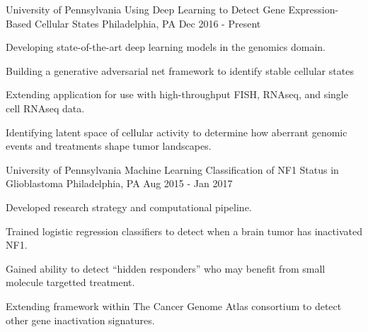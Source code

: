 

\begin{cventries}

  \cventry
    {University of Pennsylvania} %
    {Using Deep Learning to Detect Gene Expression-Based Cellular States}
    {Philadelphia, PA} %
    {Dec 2016 - Present} %
    {
      \begin{cvitems} %
        \item {Developing state-of-the-art deep learning models in the genomics
               domain.}
        \item {Building a generative adversarial net framework to identify
               stable cellular states}
        \item {Extending application for use with high-throughput FISH, RNAseq,
               and single cell RNAseq data.}
        \item {Identifying latent space of cellular activity to determine how
               aberrant genomic events and treatments shape tumor landscapes.}
      \end{cvitems}
    }

  \cventry
    {University of Pennsylvania} %
    {Machine Learning Classification of NF1 Status in Glioblastoma}
    {Philadelphia, PA} %
    {Aug 2015 - Jan 2017} %
    {
      \begin{cvitems} %
        \item {Developed research strategy and computational pipeline.}
        \item {Trained logistic regression classifiers to detect when a brain
               tumor has inactivated NF1.}
        \item {Gained ability to detect ``hidden responders'' who may benefit
               from small molecule targetted treatment.}
        \item {Extending framework within The Cancer Genome Atlas consortium
               to detect other gene inactivation signatures.}
      \end{cvitems}
    }


\end{cventries}
